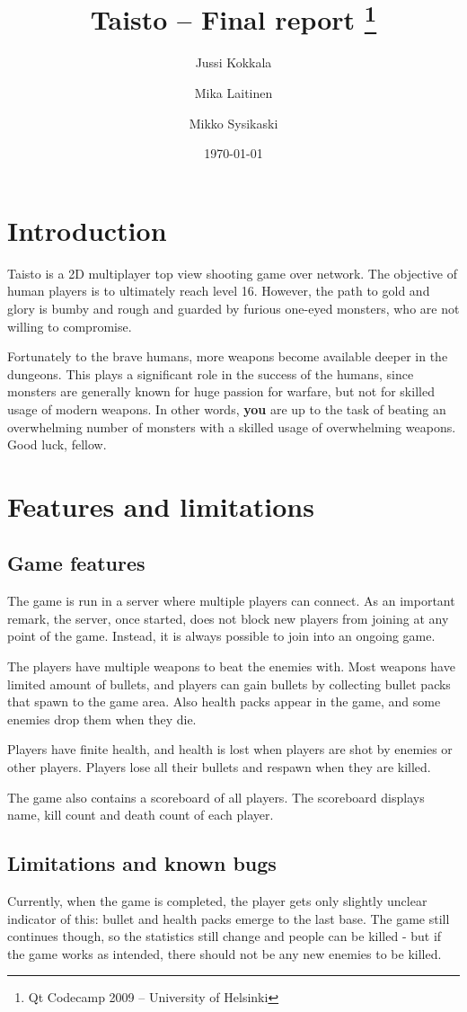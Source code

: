 \documentclass[a4paper,12pt,titlepage]{article}
\title{Taisto -- Final report \thanks{Qt Codecamp 2009 -- University of Helsinki}}
\author{Jussi Kokkala \and Mika Laitinen \and Mikko Sysikaski}
\date{\today}
\begin{document}
\maketitle

\section{Introduction}
Taisto is a 2D multiplayer top view shooting game over network. The objective of human players is to ultimately reach level 16. However, the path to gold and glory is bumby and rough and guarded by furious one-eyed monsters, who are not willing to compromise. 

Fortunately to the brave humans, more weapons become available deeper in the dungeons. This plays a significant role in the success of the humans, since monsters are generally known for huge passion for warfare, but not for skilled usage of modern weapons. In other words, \textbf{you} are up to the task of beating an overwhelming number of monsters with a skilled usage of overwhelming weapons. Good luck, fellow.

\section{Features and limitations}

\subsection{Game features}

The game is run in a server where multiple players can connect.
As an important remark, the server, once started, does not block new players from
joining at any point of the game. Instead, it is always possible to join into
an ongoing game.

The players have multiple weapons to beat the enemies with. Most weapons have limited amount of bullets, and players can gain bullets by collecting bullet packs that spawn to the game area. Also health packs appear in the game, and some enemies drop them when they die.

Players have finite health, and health is lost when players are shot by enemies or other players. Players lose all their bullets and respawn when they are killed.

The game also contains a scoreboard of all players. The scoreboard displays name, kill count and death count of each player.

\subsection {Limitations and known bugs}
Currently, when the game is completed, the player gets only slightly unclear indicator
of this: bullet and health packs emerge to the last base. The game still
continues though, so the statistics still change and people can be killed - but
if the game works as intended, there should not be any new enemies to be killed.
\end{document}
